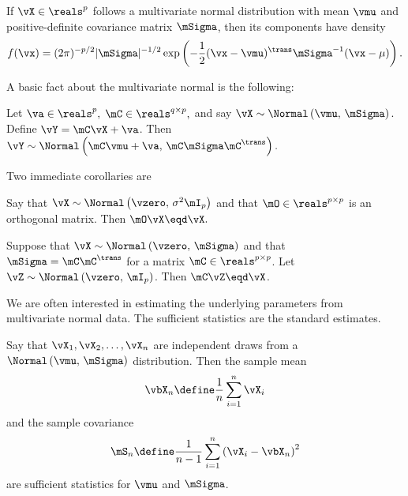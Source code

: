 \begin{proposition}
If $\vX \in \reals^p$ follows a multivariate normal distribution with mean $\vmu$ and positive-definite covariance matrix $\mSigma$, then its components have density
\begin{equation}\label{E:normal-density}
    f( \vx )
    =
    (2 \pi )^{-p/2}
    |\mSigma|^{-1/2}
    \exp\left(
        -
        \frac{1}{2}
        (\vx - \vmu)^\trans
        \mSigma^{-1}
        (\vx - \mu)
    \right).
\end{equation}
\end{proposition}

A basic fact about the multivariate normal is the following:

\begin{proposition}\label{P:scale-shift-normal}
Let 
\(
    \va \in \reals^p,
\)
\(
    \mC \in \reals^{q \times p},
\)
and say
\(
    \vX 
    \sim
    \Normal \left( 
        \vmu, \,
        \mSigma
    \right).
\)
Define $\vY = \mC \vX + \va$.  Then 
\(
    \vY
    \sim
    \Normal \left( 
        \mC \vmu + \va, \,
        \mC \mSigma \mC^\trans
    \right).
\)
\end{proposition}

\noindent
Two immediate corollaries are

\begin{corollary}\label{C:normal-orthog-invariant}
Say that
\(
    \vX 
    \sim 
    \Normal \left( 
        \vzero, \,
        \sigma^2 \mI_p
    \right)
\)
and that
\(
    \mO \in \reals^{p \times p}
\)
is an orthogonal matrix.  Then
\(
    \mO \vX \eqd \vX.
\)
\end{corollary}

\begin{corollary}
Suppose that
\(
    \vX 
    \sim 
    \Normal \left( 
        \vzero, \,
        \mSigma
    \right)
\)
and that $\mSigma = \mC \mC^\trans$ for a matrix $\mC \in \reals^{p \times p}$.
Let 
\(
    \vZ
    \sim
    \Normal \left(
        \vzero, \,
        \mI_p
    \right)
\).
Then
\(
    \mC \vZ
    \eqd
    \vX
\).
\end{corollary}    

We are often interested in estimating the underlying parameters from
multivariate normal data.  The sufficient statistics are the standard
estimates.

\begin{proposition}\label{P:normal-sufficient-stats}
Say that
\(
    \vX_1, \vX_2, \ldots, \vX_n
\) 
are independent draws from a
\(
    \Normal \left(
        \vmu, \,
        \mSigma
    \right)
\)
distribution.  Then the sample mean
\begin{equation}\label{E:sample-mean}
    \vbX_n
    \define
    \frac{1}{n}
    \sum_{i=1}^n
        \vX_i
\end{equation}
and the sample covariance
\begin{equation}\label{E:sample-covariance}
    \mS_n
    \define
    \frac{1}{n-1}
    \sum_{i=1}^n
        \left(
            \vX_i - \vbX_n
        \right)^2
\end{equation}
are sufficient statistics for $\vmu$ and $\mSigma$.
\end{proposition}

